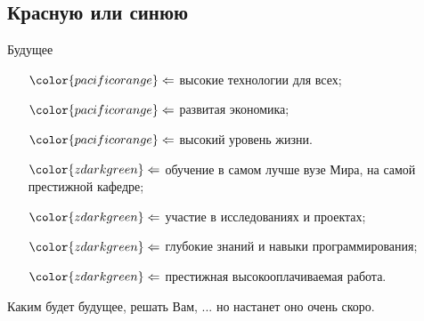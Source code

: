 \subsection{Красную или синюю}

\begin{frame}{Будущее}
    {\footnotesize
        \begin{itemize}
            \item[${\color{pacificorange} \Leftarrow}$]
                высокие технологии для всех;
            \item[${\color{pacificorange} \Leftarrow}$]
                развитая экономика;
            \item[${\color{pacificorange} \Leftarrow}$]
                высокий уровень жизни.
        \end{itemize}
    }
    \vspace{12pt}
    {\footnotesize
        \begin{itemize}
            \item[${\color{zdarkgreen} \Leftarrow}$]
                обучение в самом лучше вузе Мира,
                на самой престижной кафедре;
            \item[${\color{zdarkgreen} \Leftarrow}$]
                участие в исследованиях и проектах;
            \item[${\color{zdarkgreen} \Leftarrow}$]
                глубокие знаний и навыки программирования;
            \item[${\color{zdarkgreen} \Leftarrow}$]
                престижная высокооплачиваемая работа.
        \end{itemize}
    }
    \vspace{12pt}
    Каким будет будущее, решать Вам, {\color{zdarkgreen} ... но настанет оно очень скоро.}

\end{frame}


